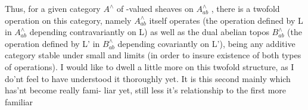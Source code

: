 Thus,  for a given category  $A^{\wedge}$  of -valued sheaves on $A^{\wedge}_{ab}$ ,  there
is a twofold operation on this category,  namely  $A^{\wedge}_{ab}$ itself operates
(the operation defined by L in $A^{\wedge}_{ab}$ depending contravariantly on L) as
well as the dual abelian topos $B^{\wedge}_{ab}$ (the operation defined by L' in $B^{\wedge}_{ab}$
depending covariantly on L'),  being any  additive category
stable under small  and  limits (in order to insure existence
of both types of operations).  I would like to dwell a little more on this
twofold structure,  as I do'nt feel to have understood it thoroughly yet.
It is this second  mainly which  has'nt become really fami-%
liar yet,  still less it's relationship to the first\hand{,} more familiar

